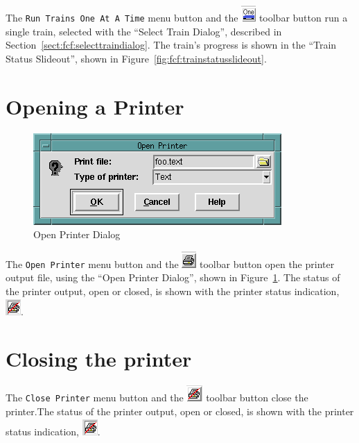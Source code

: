 The \verb=Run Trains One At A Time= menu button and the
\includegraphics{FCFRun1TrTool.png} toolbar button run a single train,
selected with the ``Select Train Dialog'', described in
Section~\ref{sect:fcf:selecttraindialog}. The train's progress is shown
in the ``Train Status Slideout'', shown in
Figure~\ref{fig:fcf:trainstatusslideout}.


\section{Opening a Printer}

\begin{figure}[hbpt]
\begin{centering}
\includegraphics{FCFOpenPrinterDialog.png}
\caption{Open Printer Dialog}
\label{fig:fcf:openprinterdialog}
\end{centering}
\end{figure}
The \verb=Open Printer= menu button and the
\includegraphics{FCFOpenPrinterTool.png} toolbar button open the printer
output file, using the ``Open Printer Dialog'', shown in
Figure~\ref{fig:fcf:openprinterdialog}. The status of the printer
output, open or closed, is shown with the printer status indication,
\includegraphics{FCFPrinterInd.png}.

\section{Closing the printer}

The \verb=Close Printer= menu button and the
\includegraphics{FCFClosePrinterTool.png} toolbar button close the
printer.The status of the printer output, open or closed, is shown with
the printer status indication, \includegraphics{FCFPrinterInd.png}.


